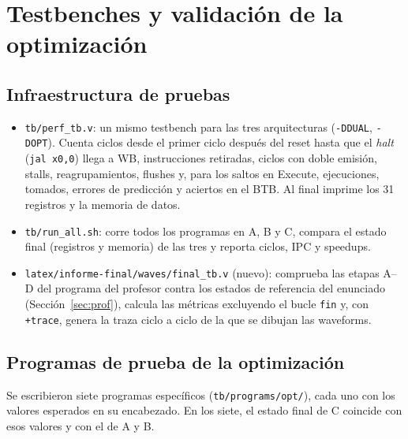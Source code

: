 \documentclass[12pt,a4paper]{article}
\begin{document}
\section{Testbenches y validación de la optimización}
\label{sec:valid}

\subsection{Infraestructura de pruebas}

\begin{itemize}
    \item \texttt{tb/perf\_tb.v}: un mismo testbench para las tres arquitecturas (\texttt{-DDUAL}, \texttt{-DOPT}). Cuenta ciclos desde el primer ciclo después del reset hasta que el \textit{halt} (\texttt{jal x0,0}) llega a WB, instrucciones retiradas, ciclos con doble emisión, stalls, reagrupamientos, flushes y, para los saltos en Execute, ejecuciones, tomados, errores de predicción y aciertos en el BTB. Al final imprime los 31 registros y la memoria de datos.
    \item \texttt{tb/run\_all.sh}: corre todos los programas en A, B y C, compara el estado final (registros y memoria) de las tres y reporta ciclos, IPC y speedups.
    \item \texttt{latex/informe-final/waves/final\_tb.v} (nuevo): comprueba las etapas A--D del programa del profesor contra los estados de referencia del enunciado (Sección~\ref{sec:prof}), calcula las métricas excluyendo el bucle \texttt{fin} y, con \texttt{+trace}, genera la traza ciclo a ciclo de la que se dibujan las waveforms.
\end{itemize}

\subsection{Programas de prueba de la optimización}

Se escribieron siete programas específicos (\texttt{tb/programs/opt/}), cada uno con los valores esperados en su encabezado. En los siete, el estado final de C coincide con esos valores y con el de A y B.
\end{document}
